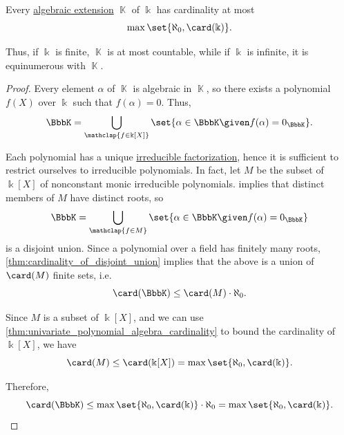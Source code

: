 \begin{lemma}\label{thm:algebraic_extension_cardinality}
  Every \hyperref[def:algebraic_extension]{algebraic extension} \( \BbbK \) of \( \Bbbk \) has cardinality at most
  \begin{equation*}
    \max\set{ \aleph_0, \card(\Bbbk) }.
  \end{equation*}

  Thus, if \( \Bbbk \) is finite, \( \BbbK \) is at most countable, while if \( \Bbbk \) is infinite, it is equinumerous with \( \BbbK \).
\end{lemma}
\begin{proof}
  Every element \( \alpha \) of \( \BbbK \) is algebraic in \( \BbbK \), so there exists a polynomial \( f(X) \) over \( \Bbbk \) such that \( f(\alpha) = 0 \). Thus,
  \begin{equation*}
    \BbbK = \bigcup_{\mathclap{f \in \Bbbk[X]}} \set{ \alpha \in \BbbK \given f(\alpha) = 0_\BbbK }.
  \end{equation*}

  Each polynomial has a unique \hyperref[def:irreducible_factorization]{irreducible factorization}, hence it is sufficient to restrict ourselves to irreducible polynomials. In fact, let \( M \) be the subset of \( \Bbbk[X] \) of nonconstant monic irreducible polynomials.  implies that distinct members of \( M \) have distinct roots, so
  \begin{equation*}
    \BbbK = \bigcup_{\mathclap{f \in M}} \set{ \alpha \in \BbbK \given f(\alpha) = 0_\BbbK }
  \end{equation*}
  is a disjoint union. Since a polynomial over a field has finitely many roots, \cref{thm:cardinality_of_disjoint_union} implies that the above is a union of \( \card(M) \) finite sets, i.e.
  \begin{equation*}
    \card(\BbbK) \leq \card(M) \cdot \aleph_0.
  \end{equation*}

  Since \( M \) is a subset of \( \Bbbk[X] \), and we can use \cref{thm:univariate_polynomial_algebra_cardinality} to bound the cardinality of \( \Bbbk[X] \), we have
  \begin{equation*}
    \card(M) \leq \card(\Bbbk[X]) = \max\set{ \aleph_0, \card(\Bbbk) }.
  \end{equation*}

  Therefore,
  \begin{equation*}
    \card(\BbbK) \leq \max\set{ \aleph_0, \card(\Bbbk) } \cdot \aleph_0 = \max\set{ \aleph_0, \card(\Bbbk) }.
  \end{equation*}


\end{proof}
